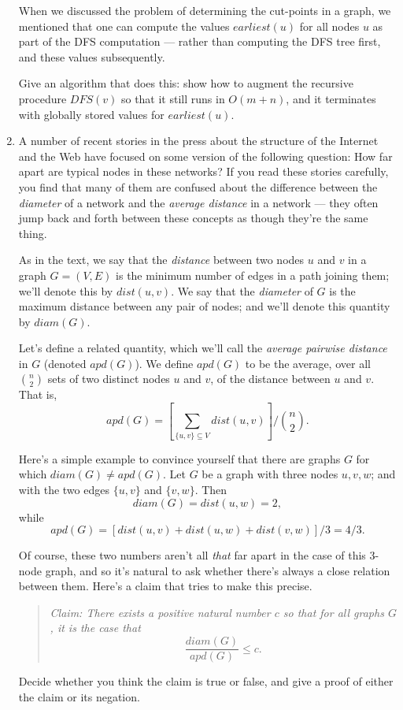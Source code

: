 \documentclass[12pt]{article}
\begin{document}
\begin{enumerate}
When we discussed the problem of determining the
cut-points in a graph, 
we mentioned that one can compute the values
${earliest}(u)$ for all nodes $u$ as
part of the DFS computation --- rather than computing
the DFS tree first, and these values subsequently.

Give an algorithm that does this:
show how to augment the recursive procedure 
$DFS(v)$ so that it still runs in $O(m + n)$,
and it terminates with globally stored values
for ${earliest}(u)$.


\item 

A number of recent stories in the press about
the structure of the Internet and the Web
have focused on some version of the following question:
How far apart are typical nodes in these networks?
If you read these stories carefully,
you find that many of them are confused about the difference
between the {\em diameter} of a network and
the {\em average distance} in a network ---
they often jump back and forth between these
concepts as though they're the same thing.

As in the text, we say that the {\em distance} between
two nodes $u$ and $v$ in a graph $G = (V,E)$
is the minimum number
of edges in a path joining them;
we'll denote this by $dist(u,v)$.
We say that the
{\em diameter} of $G$ is the maximum distance between
any pair of nodes; and
we'll denote this quantity by $diam(G)$.

Let's define a related quantity, which we'll call
the {\em average pairwise distance} in $G$
(denoted $apd(G)$).
We define $apd(G)$ to be the average, over all ${n \choose 2}$
sets of two distinct nodes $u$ and $v$, of the distance
between $u$ and $v$.
That is,
$$apd(G) = \left[ \sum_{\{u, v\} \subseteq V} dist(u,v) \right] / {{n \choose 2}}.$$

Here's a simple example to convince yourself that there
are graphs $G$ for which $diam(G) \neq apd(G)$.
Let $G$ be a graph with three nodes $u, v, w$;
and with the two edges $\{u,v\}$ and $\{v,w\}$.
Then $$diam(G) = dist(u,w) = 2,$$
while
$$apd(G) = [dist(u,v) + dist(u,w) + dist(v,w)] / 3 = 4/3.$$

Of course, these two numbers aren't all {\em that} far apart
in the case of this 3-node graph, and so it's natural
to ask whether there's always a close relation between them.
Here's a claim that tries to make this precise.
\begin{quote}
{\em Claim: There exists a positive natural number $c$ so that
for all graphs $G$, it is the case that
$$\frac{diam(G)}{apd(G)} \leq c.$$}
\end{quote}
Decide whether you think the claim is true or false,
and give a proof of either the claim or its negation.


\end{enumerate}
\end{document}
